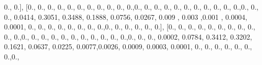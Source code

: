 \documentclass[
]{book}
\newenvironment{Shaded}{\begin{snugshade}}{\end{snugshade}}
\newcommand{\FloatTok}[1]{\textcolor[rgb]{0.00,0.00,0.81}{#1}}
\newcommand{\NormalTok}[1]{#1}
\begin{document}
\begin{Shaded}
\begin{Highlighting}[]
\FloatTok{0.}\NormalTok{, }\FloatTok{0.}\NormalTok{], [}\FloatTok{0.}\NormalTok{, }\FloatTok{0.}\NormalTok{, }\FloatTok{0.}\NormalTok{, }\FloatTok{0.}\NormalTok{, }\FloatTok{0.}\NormalTok{, }\FloatTok{0.}\NormalTok{, }\FloatTok{0.}\NormalTok{, }\FloatTok{0.}\NormalTok{, }\FloatTok{0.}\NormalTok{, }\FloatTok{0.}\NormalTok{, }\FloatTok{0.}\NormalTok{,}\FloatTok{0.}\NormalTok{, }\FloatTok{0.}\NormalTok{, }\FloatTok{0.}\NormalTok{, }\FloatTok{0.}\NormalTok{, }\FloatTok{0.}\NormalTok{, }\FloatTok{0.}\NormalTok{, }\FloatTok{0.}\NormalTok{,}
\FloatTok{0.}\NormalTok{, }\FloatTok{0.}\NormalTok{, }\FloatTok{0.}\NormalTok{, }\FloatTok{0.}\NormalTok{,}\FloatTok{0.}\NormalTok{, }\FloatTok{0.}\NormalTok{, }\FloatTok{0.}\NormalTok{, }\FloatTok{0.0414}\NormalTok{, }\FloatTok{0.3051}\NormalTok{, }\FloatTok{0.3488}\NormalTok{, }\FloatTok{0.1888}\NormalTok{, }\FloatTok{0.0756}\NormalTok{, }\FloatTok{0.0267}\NormalTok{, }\FloatTok{0.009}
\NormalTok{, }\FloatTok{0.003}\NormalTok{ ,}\FloatTok{0.001}\NormalTok{ , }\FloatTok{0.0004}\NormalTok{, }\FloatTok{0.0001}\NormalTok{, }\FloatTok{0.}\NormalTok{, }\FloatTok{0.}\NormalTok{, }\FloatTok{0.}\NormalTok{, }\FloatTok{0.}\NormalTok{, }\FloatTok{0.}\NormalTok{, }\FloatTok{0.}\NormalTok{, }\FloatTok{0.}\NormalTok{, }\FloatTok{0.}\NormalTok{,}\FloatTok{0.}\NormalTok{, }\FloatTok{0.}\NormalTok{, }\FloatTok{0.}\NormalTok{, }\FloatTok{0.}\NormalTok{,}
\FloatTok{0.}\NormalTok{, }\FloatTok{0.}\NormalTok{], [}\FloatTok{0.}\NormalTok{, }\FloatTok{0.}\NormalTok{, }\FloatTok{0.}\NormalTok{, }\FloatTok{0.}\NormalTok{, }\FloatTok{0.}\NormalTok{, }\FloatTok{0.}\NormalTok{, }\FloatTok{0.}\NormalTok{, }\FloatTok{0.}\NormalTok{, }\FloatTok{0.}\NormalTok{, }\FloatTok{0.}\NormalTok{, }\FloatTok{0.}\NormalTok{,}\FloatTok{0.}\NormalTok{, }\FloatTok{0.}\NormalTok{, }\FloatTok{0.}\NormalTok{, }\FloatTok{0.}\NormalTok{, }\FloatTok{0.}\NormalTok{, }\FloatTok{0.}\NormalTok{, }\FloatTok{0.}\NormalTok{,}
\FloatTok{0.}\NormalTok{, }\FloatTok{0.}\NormalTok{, }\FloatTok{0.}\NormalTok{, }\FloatTok{0.}\NormalTok{,}\FloatTok{0.}\NormalTok{, }\FloatTok{0.}\NormalTok{, }\FloatTok{0.}\NormalTok{, }\FloatTok{0.0002}\NormalTok{, }\FloatTok{0.0784}\NormalTok{, }\FloatTok{0.3412}\NormalTok{, }\FloatTok{0.3202}\NormalTok{, }\FloatTok{0.1621}\NormalTok{, }\FloatTok{0.0637}\NormalTok{,}
\FloatTok{0.0225}\NormalTok{, }\FloatTok{0.0077}\NormalTok{,}\FloatTok{0.0026}\NormalTok{, }\FloatTok{0.0009}\NormalTok{, }\FloatTok{0.0003}\NormalTok{, }\FloatTok{0.0001}\NormalTok{, }\FloatTok{0.}\NormalTok{, }\FloatTok{0.}\NormalTok{, }\FloatTok{0.}\NormalTok{, }\FloatTok{0.}\NormalTok{, }\FloatTok{0.}\NormalTok{, }\FloatTok{0.}\NormalTok{, }\FloatTok{0.}\NormalTok{,}\FloatTok{0.}\NormalTok{,}

\end{Highlighting}
\end{Shaded}
\end{document}
